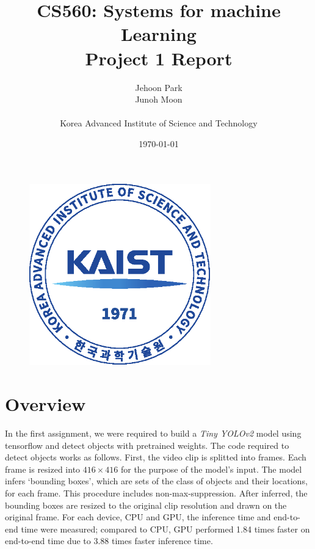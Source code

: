 \documentclass[a4paper,12pt]{article}
\begin{document}
 
\title{CS560: Systems for machine Learning\\\large Project 1 Report}
\author{Jehoon Park\\Junoh Moon\\\\Korea Advanced Institute of Science and Technology}
\date{\today}

\begin{figure}[!b]
	\centering
	\includegraphics[width=0.7\textwidth]{./kaist_emblem2.eps}
	\label{figure:school_logo}
\end{figure}

\maketitle
\thispagestyle{empty} %
\newpage

\section{Overview}
In the first assignment, we were required to build a \emph{Tiny YOLOv2} model using tensorflow and detect objects with pretrained weights. The code required to detect objects works as follows. First, the video clip is splitted into frames. Each frame is resized into $416 \times 416$ for the purpose of the model's input. The model infers `bounding boxes', which are sets of the class of objects and their locations, for each frame. This procedure includes non-max-suppression. After inferred, the bounding boxes are resized to the original clip resolution and drawn on the original frame.
For each device, CPU and GPU, the inference time and end-to-end time were measured; compared to CPU, GPU performed 1.84 times faster on end-to-end time due to 3.88 times faster inference time.
\end{document}
